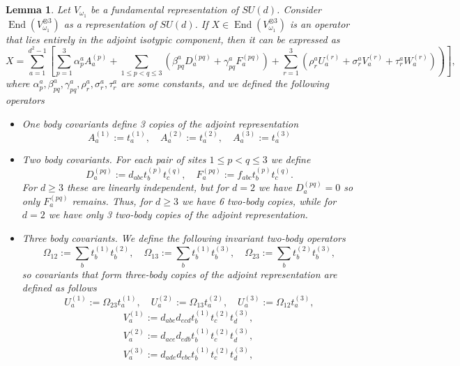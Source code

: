 \documentclass[10pt,twocolumn,superscriptaddress,aps,amsmath,amssymb,citeautoscript,floatfix,prx]{revtex4-2}
\theoremstyle{plain}
\theoremstyle{plain}
\theoremstyle{plain}
\theoremstyle{plain}
\theoremstyle{plain}
\theoremstyle{plain}
\theoremstyle{plain}
\newtheorem{smlemma}[smtheorem]{Lemma}
\theoremstyle{definition}
\theoremstyle{plain}
\begin{document}
\begin{appendix}
\begin{smlemma}\label{lem:adjoint-3site}
    Let $V_{\omega_1}$ be a fundamental representation of $SU(d)$. Consider
    $\operatorname{End}(V_{\omega_1}^{\otimes 3})$ as a representation of $SU(d)$. If $X\in \operatorname{End}(V_{\omega_1}^{\otimes 3})$ is an operator
    that lies entirely in the adjoint isotypic component, then it can be expressed as
    \[
        \left.X=\sum_{a=1}^{d^2-1}\left[\sum_{p=1}^3 \alpha_p^a A_a^{(p)}+\sum_{1 \leq p<q \leq 3}\left(\beta_{p q}^a D_a^{(p q)}+\gamma_{p q}^a F_a^{(p q)}\right)+\sum_{r=1}^3\left(\rho_r^a U_a^{(r)}+\sigma_r^a V_a^{(r)}+\tau_r^a W_a^{(r)}\right)\right)\right],
    \]
    where $\alpha_p^a, \beta_{p q}^a, \gamma_{p q}^a, \rho_r^a, \sigma_r^a, \tau_r^a$ are some constants, and we defined the following operators
    \begin{itemize}
    \item  One body covariants define 3 copies of the adjoint representation
        \[
            A_a^{(1)}:=t_a^{(1)}, \quad A_a^{(2)}:=t_a^{(2)}, \quad A_a^{(3)}:=t_a^{(3)}
        \]
    \item  Two body covariants. For each pair of sites $1 \leq p<q \leq 3$ we define
        \[
            D_a^{(p q)}:=d_{a b c} t_b^{(p)} t_c^{(q)}, \quad F_a^{(p q)}:=f_{a b c} t_b^{(p)} t_c^{(q)}.
        \]
        For $d\geq 3$ these are linearly independent, but for $d=2$ we have $D_a^{(p q)}=0$ so only $F_a^{(p q)}$ remains.
        Thus, for $d\geq 3$ we have 6 two-body copies, while for $d=2$ we have only 3 two-body copies of the adjoint representation.
    \item  Three body covariants. We define the following invariant two-body operators
        \[
            \Omega_{12}:=\sum_b t_b^{(1)} t_b^{(2)}, \quad \Omega_{13}:=\sum_b t_b^{(1)} t_b^{(3)}, \quad \Omega_{23}:=\sum_b t_b^{(2)} t_b^{(3)},
        \]
        so covariants that form three-body copies of the adjoint representation are defined as follows
        \[
            U_a^{(1)}:=\Omega_{23} t_a^{(1)}, \quad U_a^{(2)}:=\Omega_{13} t_a^{(2)}, \quad U_a^{(3)}:=\Omega_{12} t_a^{(3)},
        \]
        \[
            \begin{aligned}
            & V_a^{(1)}:=d_{a b e} d_{e c d} t_b^{(1)} t_c^{(2)} t_d^{(3)}, \\
            & V_a^{(2)}:=d_{a c e} d_{e d b} t_b^{(1)} t_c^{(2)} t_d^{(3)}, \\
            & V_a^{(3)}:=d_{a d e} d_{e b c} t_b^{(1)} t_c^{(2)} t_d^{(3)},
            \end{aligned}\quad
\]
\end{itemize}
\end{smlemma}
\end{appendix}
\end{document}
